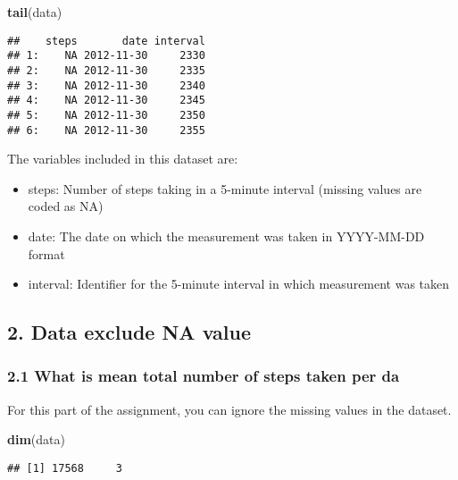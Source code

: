 \documentclass[
]{article}
\newenvironment{Shaded}{\begin{snugshade}}{\end{snugshade}}
\newcommand{\KeywordTok}[1]{\textcolor[rgb]{0.13,0.29,0.53}{\textbf{#1}}}
\newcommand{\NormalTok}[1]{#1}
\providecommand{\tightlist}{%
  \setlength{\itemsep}{0pt}\setlength{\parskip}{0pt}}
\begin{document}
\begin{Shaded}
\begin{Highlighting}[]
\KeywordTok{tail}\NormalTok{(data)}
\end{Highlighting}
\end{Shaded}

\begin{verbatim}
##    steps       date interval
## 1:    NA 2012-11-30     2330
## 2:    NA 2012-11-30     2335
## 3:    NA 2012-11-30     2340
## 4:    NA 2012-11-30     2345
## 5:    NA 2012-11-30     2350
## 6:    NA 2012-11-30     2355
\end{verbatim}

The variables included in this dataset are:

\begin{itemize}
\tightlist
\item
  steps: Number of steps taking in a 5-minute interval (missing values
  are coded as NA)
\item
  date: The date on which the measurement was taken in YYYY-MM-DD format
\item
  interval: Identifier for the 5-minute interval in which measurement
  was taken
\end{itemize}

\hypertarget{data-exclude-na-value}{%
\subsection{2. Data exclude NA value}\label{data-exclude-na-value}}

\hypertarget{what-is-mean-total-number-of-steps-taken-per-da}{%
\subsubsection{2.1 What is mean total number of steps taken per
da}\label{what-is-mean-total-number-of-steps-taken-per-da}}

For this part of the assignment, you can ignore the missing values in
the dataset.

\begin{Shaded}
\begin{Highlighting}[]
\KeywordTok{dim}\NormalTok{(data)}
\end{Highlighting}
\end{Shaded}

\begin{verbatim}
## [1] 17568     3
\end{verbatim}
\end{document}
